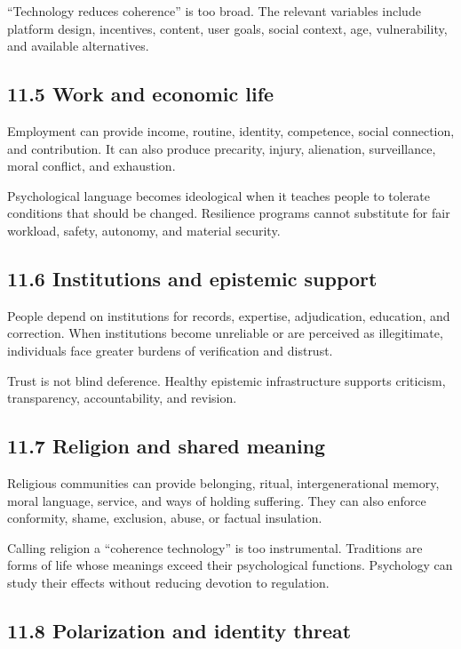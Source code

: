\documentclass[
  11pt,
]{article}
\begin{document}
``Technology reduces coherence'' is too broad. The relevant variables
include platform design, incentives, content, user goals, social
context, age, vulnerability, and available alternatives.

\subsection{11.5 Work and economic life}\label{work-and-economic-life}

Employment can provide income, routine, identity, competence, social
connection, and contribution. It can also produce precarity, injury,
alienation, surveillance, moral conflict, and exhaustion.

Psychological language becomes ideological when it teaches people to
tolerate conditions that should be changed. Resilience programs cannot
substitute for fair workload, safety, autonomy, and material security.

\subsection{11.6 Institutions and epistemic
support}\label{institutions-and-epistemic-support}

People depend on institutions for records, expertise, adjudication,
education, and correction. When institutions become unreliable or are
perceived as illegitimate, individuals face greater burdens of
verification and distrust.

Trust is not blind deference. Healthy epistemic infrastructure supports
criticism, transparency, accountability, and revision.

\subsection{11.7 Religion and shared
meaning}\label{religion-and-shared-meaning}

Religious communities can provide belonging, ritual, intergenerational
memory, moral language, service, and ways of holding suffering. They can
also enforce conformity, shame, exclusion, abuse, or factual insulation.

Calling religion a ``coherence technology'' is too instrumental.
Traditions are forms of life whose meanings exceed their psychological
functions. Psychology can study their effects without reducing devotion
to regulation.

\subsection{11.8 Polarization and identity
threat}\label{polarization-and-identity-threat}
\end{document}
